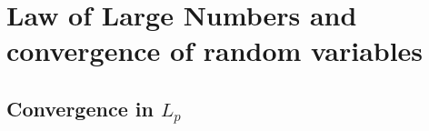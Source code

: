 

\chapter{Law of Large Numbers and convergence of random variables}

\section{Convergence in $L_p$}

